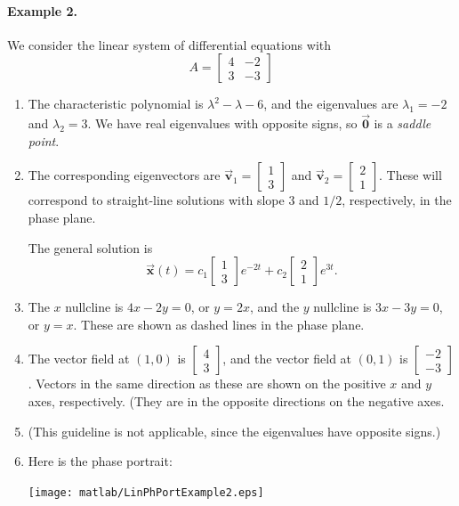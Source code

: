 \documentclass{book}
\newcommand{\BV}{\vec{\textbf{v}}}
\newcommand{\BX}{\vec{\textbf{x}}}
\newcommand{\BZ}{\vec{\textbf{0}}}  %
\begin{document}
\paragraph{Example 2.}
We consider the linear system of differential equations
with
\[
   A = \begin{bmatrix}
            4 & -2 \\ 3 & -3
       \end{bmatrix}
\]
\begin{enumerate}
\item
The characteristic polynomial is
$\lambda^2 -\lambda -6$, and the eigenvalues are
$\lambda_1 = -2$ and $\lambda_2 = 3$.
We have real eigenvalues with opposite signs, so
$\BZ$ is a \emph{saddle point}.
\item
The corresponding eigenvectors are
$\BV_1 = \begin{bmatrix} 1 \\ 3 \end{bmatrix}$
and
$\BV_2 = \begin{bmatrix} 2 \\ 1 \end{bmatrix}$.
These will correspond to straight-line solutions with
slope $3$ and $1/2$, respectively, in the phase plane.

The general solution is
\begin{equation}
\BX(t) = c_1 \begin{bmatrix} 1 \\ 3 \end{bmatrix} e^{-2t}
   + c_2 \begin{bmatrix} 2 \\ 1 \end{bmatrix} e^{3t}.
\end{equation}
\item
The $x$ nullcline is $4x-2y=0$, or $y = 2x$, and the
$y$ nullcline is $3x-3y=0$, or $y=x$.  These are shown
as dashed lines in the phase plane.
\item
The vector field at $(1,0)$ is $\begin{bmatrix} 4 \\ 3 \end{bmatrix}$,
and the vector field at $(0,1)$
is $\begin{bmatrix} -2 \\ -3 \end{bmatrix}$.  Vectors in the
same direction as these are shown on the positive $x$ and $y$ axes,
respectively.
(They are in the opposite directions on the negative axes.
\item
(This guideline is not applicable, since the eigenvalues
have opposite signs.)
\item
Here is the phase portrait:

\noindent
\centerline{\texttt{[image: matlab/LinPhPortExample2.eps]}}
\end{enumerate}
\end{document}

